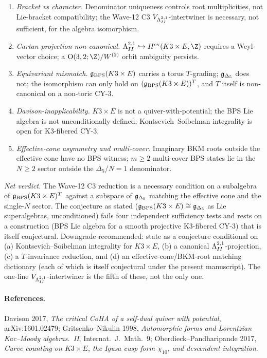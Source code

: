 \begin{enumerate}
\item \emph{Bracket vs character.} Denominator uniqueness controls
  root multiplicities, not Lie-bracket compatibility; the Wave-12
  C3 $V_{\Lambda^{2,1}_{II}}$-intertwiner is necessary, not sufficient, for
  the algebra isomorphism.
\item \emph{Cartan projection non-canonical.} $\LambdaII
  \hookrightarrow H^{\mathrm{ev}}(K3 \times E, \Z)$ requires a
  Weyl-vector choice; a $\mathrm{O}(3, 2; \Z)/W^{(2)}$ orbit
  ambiguity persists.
\item \emph{Equivariant mismatch.} $\mathfrak{g}_{\mathrm{BPS}}(K3 \times E)$ carries a torus
  $T$-grading; $\mathfrak{g}_{\Delta_5}$ does not; the isomorphism can only hold on
  $(\mathfrak{g}_{\mathrm{BPS}}(K3 \times E))^T$, and $T$ itself is non-canonical on a non-toric
  CY-3.
\item \emph{Davison-inapplicability.} $K3 \times E$ is not a
  quiver-with-potential; the BPS Lie algebra is not unconditionally
  defined; Kontsevich--Soibelman integrality is open for K3-fibered
  CY-3.
\item \emph{Effective-cone asymmetry and multi-cover.} Imaginary
  BKM roots outside the effective cone have no BPS witness;
  $m \geq 2$ multi-cover BPS states lie in the $N \geq 2$ sector
  outside the $\Delta_5$/$N = 1$ denominator.
\end{enumerate}

\emph{Net verdict.} The Wave-12 C3 reduction is a necessary
condition on a subalgebra of $\mathfrak{g}_{\mathrm{BPS}}(K3 \times E)^T$ against a subspace of
$\mathfrak{g}_{\Delta_5}$ matching the effective cone and the single-$N$ sector.
The conjecture as stated ($\mathfrak{g}_{\mathrm{BPS}}(K3 \times E) \cong \mathfrak{g}_{\Delta_5}$ as Lie
superalgebras, unconditioned) fails four independent sufficiency
tests and rests on a construction (BPS Lie algebra for a smooth
projective K3-fibered CY-3) that is itself conjectural. Downgrade
recommended: state as a conjecture conditional on (a)
Kontsevich--Soibelman integrality for $K3 \times E$, (b) a
canonical $\Lambda^{2,1}_{II}$-projection, (c) a $T$-invariance reduction,
and (d) an effective-cone/BKM-root matching dictionary
(each of which is itself conjectural under the present manuscript).
The one-line $V_{\Lambda^{2,1}_{II}}$-intertwiner is the fifth of these,
not the only one.

\paragraph{References.}
Davison 2017, \emph{The critical CoHA of a self-dual quiver with
  potential}, arXiv:1601.02479;
Gritsenko--Nikulin 1998, \emph{Automorphic forms and Lorentzian
  Kac--Moody algebras.\ II}, Internat.\ J.\ Math.\ 9;
Oberdieck--Pandharipande 2017, \emph{Curve counting on $K3 \times
  E$, the Igusa cusp form $\chi_{10}$, and descendent integration}.
